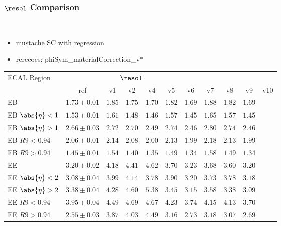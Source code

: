 \documentclass[8pt,serif]{beamer}
\begin{document}
\begin{frame}
  \frametitle{$\resol $ Comparison}
\\

\begin{itemize}
  \item mustache SC with regression
  \item rerecoes: phiSym\_materialCorrection\_v*
  \end{itemize}

  
  \begin{center}
    \emph{\dataSample}\xspace \invMassVarName

\tiny \begin{tabular}{|l|c|c|c|c|c|c|c|c|c|c|} \hline  
ECAL Region & \multicolumn{6}{c|}{$\resol$} \\
            & ref  &  v1  & v2  &  v4  &  v5  & v6 & v7 & v8 & v9 & v10\\ 
\hline           
EB                  & $1.73 \pm 0.01$ & $1.85$ & $1.75$ & $1.70$ & $1.82$ & $1.69$ & $1.88$ & $1.82$ & $1.69$ \\
EB $\abs{\eta} < 1$ & $1.53 \pm 0.01$ & $1.61$ & $1.48$ & $1.46$ & $1.57$ & $1.45$ & $1.65$ & $1.57$ & $1.45$ \\
EB $\abs{\eta} > 1$ & $2.66 \pm 0.03$ & $2.72$ & $2.70$ & $2.49$ & $2.74$ & $2.46$ & $2.80$ & $2.74$ & $2.46$ \\
EB $R9 < 0.94$      & $2.06 \pm 0.01$ & $2.14$ & $2.08$ & $2.00$ & $2.13$ & $1.99$ & $2.18$ & $2.13$ & $1.99$ \\
EB $R9 > 0.94$      & $1.45 \pm 0.01$ & $1.54$ & $1.40$ & $1.35$ & $1.49$ & $1.34$ & $1.58$ & $1.49$ & $1.34$ \\
\hline
EE                  & $3.20 \pm 0.02$ & $4.18$ & $4.41$ & $4.62$ & $3.70$ & $3.23$ & $3.68$ & $3.60$ & $3.20$ \\
EE $\abs{\eta} < 2$ & $3.08 \pm 0.04$ & $3.99$ & $4.14$ & $3.78$ & $3.90$ & $3.20$ & $3.73$ & $3.78$ & $3.18$ \\
EE $\abs{\eta} > 2$ & $3.38 \pm 0.04$ & $4.28$ & $4.60$ & $5.38$ & $3.45$ & $3.15$ & $3.58$ & $3.38$ & $3.09$ \\
EE $R9 < 0.94$      & $3.95 \pm 0.04$ & $4.49$ & $4.69$ & $4.67$ & $4.23$ & $3.74$ & $4.15$ & $4.13$ & $3.70$ \\
EE $R9 > 0.94$      & $2.55 \pm 0.03$ & $3.87$ & $4.03$ & $4.49$ & $3.16$ & $2.73$ & $3.18$ & $3.07$ & $2.69$ \\
        \hline  
\end{tabular} 
  \end{center}


\end{frame}
\end{document}
